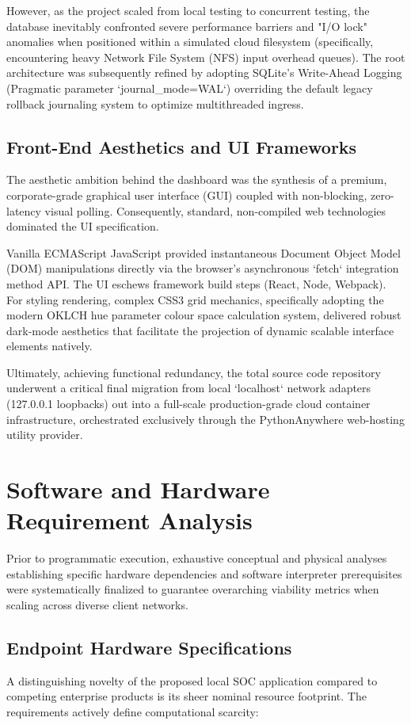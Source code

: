 However, as the project scaled from local testing to concurrent testing, the database inevitably confronted severe performance barriers and "I/O lock" anomalies when positioned within a simulated cloud filesystem (specifically, encountering heavy Network File System (NFS) input overhead queues). The root architecture was subsequently refined by adopting SQLite's Write-Ahead Logging (Pragmatic parameter `journal\_mode=WAL`) overriding the default legacy rollback journaling system to optimize multithreaded ingress.

\subsection{Front-End Aesthetics and UI Frameworks}
The aesthetic ambition behind the dashboard was the synthesis of a premium, corporate-grade graphical user interface (GUI) coupled with non-blocking, zero-latency visual polling. Consequently, standard, non-compiled web technologies dominated the UI specification. 

Vanilla ECMAScript JavaScript provided instantaneous Document Object Model (DOM) manipulations directly via the browser's asynchronous `fetch` integration method API. The UI eschews framework build steps (React, Node, Webpack). For styling rendering, complex CSS3 grid mechanics, specifically adopting the modern OKLCH hue parameter colour space calculation system, delivered robust dark-mode aesthetics that facilitate the projection of dynamic scalable interface elements natively.

Ultimately, achieving functional redundancy, the total source code repository underwent a critical final migration from local `localhost` network adapters (127.0.0.1 loopbacks) out into a full-scale production-grade cloud container infrastructure, orchestrated exclusively through the PythonAnywhere web-hosting utility provider.

\section{Software and Hardware Requirement Analysis}
Prior to programmatic execution, exhaustive conceptual and physical analyses establishing specific hardware dependencies and software interpreter prerequisites were systematically finalized to guarantee overarching viability metrics when scaling across diverse client networks.

\subsection{Endpoint Hardware Specifications}
A distinguishing novelty of the proposed local SOC application compared to competing enterprise products is its sheer nominal resource footprint. The requirements actively define computational scarcity:

